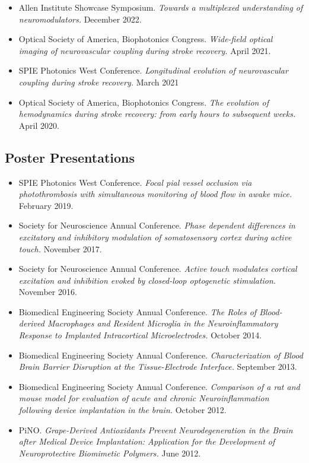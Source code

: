 \documentclass[
  letterpaper,
  DIV=11,
  numbers=noendperiod]{scrartcl}
\providecommand{\tightlist}{%
  \setlength{\itemsep}{0pt}\setlength{\parskip}{0pt}}\usepackage{longtable,booktabs,array}
\begin{document}
\begin{itemize}
\tightlist
\item
  Allen Institute Showcase Symposium. \emph{Towards a multiplexed
  understanding of neuromodulators.} December 2022.
\item
  Optical Society of America, Biophotonics Congress. \emph{Wide-field
  optical imaging of neurovascular coupling during stroke recovery.}
  April 2021.
\item
  SPIE Photonics West Conference. \emph{Longitudinal evolution of
  neurovascular coupling during stroke recovery.} March 2021
\item
  Optical Society of America, Biophotonics Congress. \emph{The evolution
  of hemodynamics during stroke recovery: from early hours to subsequent
  weeks.} April 2020.
\end{itemize}

\hypertarget{poster-presentations}{%
\subsection{Poster Presentations}\label{poster-presentations}}

\begin{itemize}
\tightlist
\item
  SPIE Photonics West Conference. \emph{Focal pial vessel occlusion via
  photothrombosis with simultaneous monitoring of blood flow in awake
  mice.} February 2019.
\item
  Society for Neuroscience Annual Conference. \emph{Phase dependent
  differences in excitatory and inhibitory modulation of somatosensory
  cortex during active touch.} November 2017.
\item
  Society for Neuroscience Annual Conference. \emph{Active touch
  modulates cortical excitation and inhibition evoked by closed-loop
  optogenetic stimulation.} November 2016.
\item
  Biomedical Engineering Society Annual Conference. \emph{The Roles of
  Blood-derived Macrophages and Resident Microglia in the
  Neuroinflammatory Response to Implanted Intracortical
  Microelectrodes.} October 2014.
\item
  Biomedical Engineering Society Annual Conference.
  \emph{Characterization of Blood Brain Barrier Disruption at the
  Tissue-Electrode Interface.} September 2013.
\item
  Biomedical Engineering Society Annual Conference. \emph{Comparison of
  a rat and mouse model for evaluation of acute and chronic
  Neuroinflammation following device implantation in the brain.} October
  2012.
\item
  PiNO. \emph{Grape-Derived Antioxidants Prevent Neurodegeneration in
  the Brain after Medical Device Implantation: Application for the
  Development of Neuroprotective Biomimetic Polymers.} June 2012.
\end{itemize}
\end{document}
